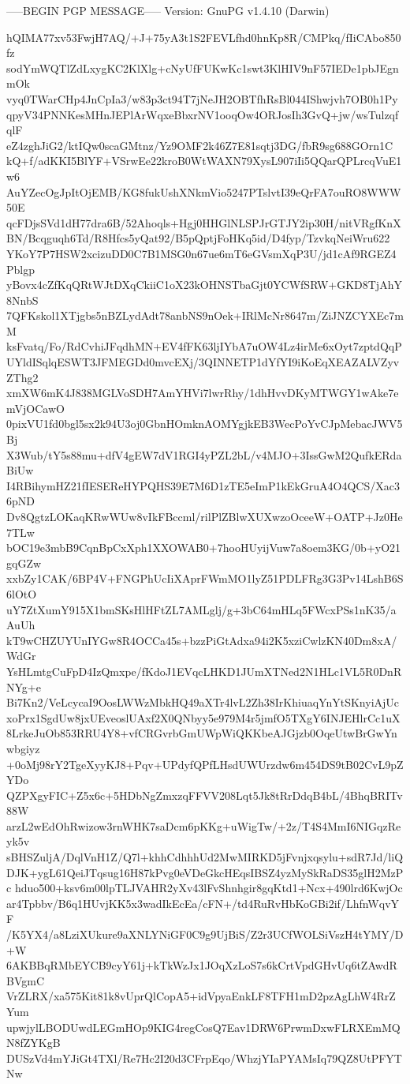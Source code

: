 -----BEGIN PGP MESSAGE-----
Version: GnuPG v1.4.10 (Darwin)

hQIMA77xv53FwjH7AQ/+J+75yA3t1S2FEVLfhd0hnKp8R/CMPkq/fIiCAbo850fz
sodYmWQTlZdLxygKC2KlXlg+cNyUfFUKwKc1swt3KlHIV9nF57IEDe1pbJEgnmOk
vyq0TWarCHp4JnCpIa3/w83p3ct94T7jNeJH2OBTfhRsBl044IShwjvh7OB0h1Py
qpyV34PNNKesMHnJEPlArWqxeBbxrNV1ooqOw4ORJosIh3GvQ+jw/wsTulzqfqlF
eZ4zghJiG2/ktIQw0scaGMtnz/Yz9OMF2k46Z7E81sqtj3DG/fbR9sg688GOrn1C
kQ+f/adKKI5BlYF+VSrwEe22kroB0WtWAXN79XysL907iIi5QQarQPLrcqVuE1w6
AuYZecOgJpItOjEMB/KG8fukUshXNkmVio5247PTslvtI39eQrFA7ouRO8WWW50E
qcFDjsSVd1dH77dra6B/52Ahoqls+Hgj0HHGlNLSPJrGTJY2ip30H/nitVRgfKnX
BN/Bcqguqh6Td/R8Hfcs5yQat92/B5pQptjFoHKq5id/D4fyp/TzvkqNeiWru622
YKoY7P7HSW2xcizuDD0C7B1MSG0n67ue6mT6eGVsmXqP3U/jd1cAf9RGEZ4Pblgp
yBovx4cZfKqQRtWJtDXqCkiiC1oX23kOHNSTbaGjt0YCWfSRW+GKD8TjAhY8NnbS
7QFKskol1XTjgbs5nBZLydAdt78anbNS9nOek+IRlMcNr8647m/ZiJNZCYXEc7mM
ksFvatq/Fo/RdCvhiJFqdhMN+EV4fFK63ljIYbA7uOW4Lz4irMe6xOyt7zptdQqP
UYldISqlqESWT3JFMEGDd0mvcEXj/3QINNETP1dYfYI9iKoEqXEAZALVZyvZThg2
xmXW6mK4J838MGLVoSDH7AmYHVi7lwrRhy/1dhHvvDKyMTWGY1wAke7emVjOCawO
0pixVU1fd0bgl5sx2k94U3oj0GbnHOmknAOMYgjkEB3WecPoYvCJpMebacJWV5Bj
X3Wub/tY5s88mu+dfV4gEW7dV1RGI4yPZL2bL/v4MJO+3IssGwM2QufkERdaBiUw
I4RBihymHZ21fIESEReHYPQHS39E7M6D1zTE5eImP1kEkGruA4O4QCS/Xac36pND
Dv8QgtzLOKaqKRwWUw8vIkFBccml/rilPlZBlwXUXwzoOceeW+OATP+Jz0He7TLw
bOC19e3mbB9CqnBpCxXph1XXOWAB0+7hooHUyijVuw7a8oem3KG/0b+yO21gqGZw
xxbZy1CAK/6BP4V+FNGPhUcIiXAprFWmMO1lyZ51PDLFRg3G3Pv14LshB6S6lOtO
uY7ZtXumY915X1bmSKsHlHFtZL7AMLglj/g+3bC64mHLq5FWcxPSs1nK35/aAuUh
kT9wCHZUYUnIYGw8R4OCCa45s+bzzPiGtAdxa94i2K5xziCwlzKN40Dm8xA/WdGr
YsHLmtgCuFpD4IzQmxpe/fKdoJ1EVqcLHKD1JUmXTNed2N1HLc1VL5R0DnRNYg+e
Bi7Kn2/VeLcycaI9OosLWWzMbkHQ49aXTr4lvL2Zh38IrKhiuaqYnYtSKnyiAjUc
xoPrx1SgdUw8jxUEveoslUAxf2X0QNbyy5e979M4r5jmfO5TXgY6INJEHlrCc1uX
8LrkeJuOb853RRU4Y8+vfCRGvrbGmUWpWiQKKbeAJGjzb0OqeUtwBrGwYnwbgiyz
+0oMj98rY2TgeXyyKJ8+Pqv+UPdyfQPfLHsdUWUrzdw6m454DS9tB02CvL9pZYDo
QZPXgyFIC+Z5x6c+5HDbNgZmxzqFFVV208Lqt5Jk8tRrDdqB4bL/4BhqBRITv88W
arzL2wEdOhRwizow3rnWHK7saDcm6pKKg+uWigTw/+2z/T4S4MmI6NIGqzReyk5v
sBHSZuljA/DqlVnH1Z/Q7l+khhCdhhhUd2MwMIRKD5jFvnjxqsylu+sdR7Jd/liQ
DJK+ygL61QeiJTqsug16H87kPvg0eVDeGkcHEqsIBSZ4yzMySkRaDS35glH2MzPc
hduo500+ksv6m00lpTLJVAHR2yXv43lFvShnhgir8gqKtd1+Ncx+490lrd6KwjOc
ar4Tpbbv/B6q1HUvjKK5x3wadIkEcEa/cFN+/td4RuRvHbKoGBi2if/LhfnWqvYF
/K5YX4/a8LziXUkure9aXNLYNiGF0C9g9UjBiS/Z2r3UCfWOLSiVszH4tYMY/D+W
6AKBBqRMbEYCB9cyY61j+kTkWzJx1JOqXzLoS7s6kCrtVpdGHvUq6tZAwdRBVgmC
VrZLRX/xa575Kit81k8vUprQlCopA5+idVpyaEnkLF8TFH1mD2pzAgLhW4RrZYum
upwjylLBODUwdLEGmHOp9KIG4regCosQ7Eav1DRW6PrwmDxwFLRXEmMQN8fZYKgB
DUSzVd4mYJiGt4TXl/Re7Hc2I20d3CFrpEqo/WhzjYIaPYAMsIq79QZ8UtPFYTNw
